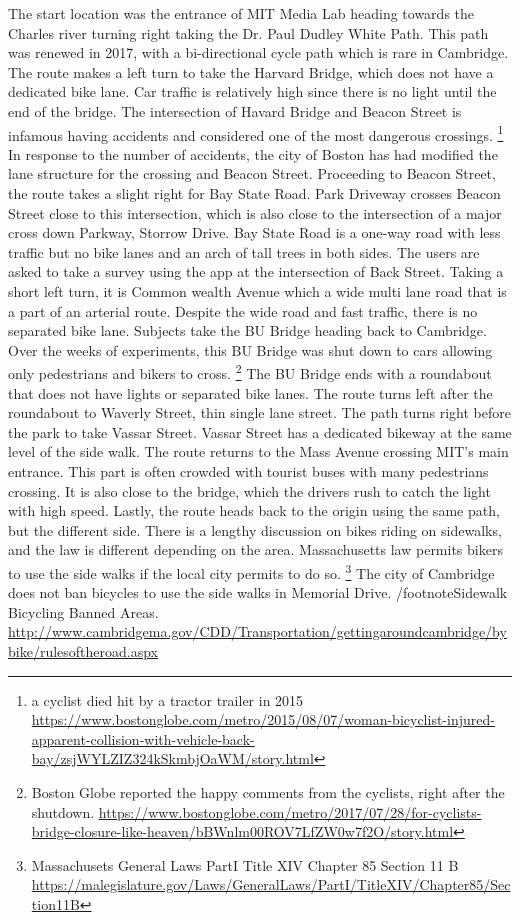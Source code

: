 The start location was the entrance of MIT Media Lab heading towards the
Charles river turning right taking the Dr. Paul Dudley White Path. This
path was renewed in 2017, with a bi-directional cycle path which is rare in
Cambridge. The route makes a left turn to take the Harvard Bridge, which
does not have a dedicated bike lane. Car traffic is relatively high since
there is no light until the end of the bridge. The intersection of Havard
Bridge and Beacon Street is infamous having accidents and considered one of
the most dangerous crossings. 
\footnote{a cyclist died hit by a tractor trailer in 2015
\url{https://www.bostonglobe.com/metro/2015/08/07/woman-bicyclist-injured-apparent-collision-with-vehicle-back-bay/zsjWYLZIZ324kSkmbjOaWM/story.html}}
In response to the number of accidents, the city of Boston has had modified
the lane structure for the crossing and Beacon Street. Proceeding to Beacon
Street, the route takes a slight right for Bay State Road. Park Driveway
crosses Beacon Street close to this intersection, which is also close to
the intersection of a major cross down Parkway, Storrow Drive. Bay State
Road is a one-way road with less traffic but no bike lanes and an arch of
tall trees in both sides. The users are asked to take a survey using the
app at the intersection of Back Street. Taking a short left turn, it is
Common wealth Avenue which a wide multi lane road that is a part of an
arterial route. Despite the wide road and fast traffic, there is no
separated bike lane. Subjects take the BU Bridge heading back to Cambridge.
Over the weeks of experiments, this BU Bridge was shut down to cars
allowing only pedestrians and bikers to cross.
\footnote{Boston Globe reported the happy comments from the cyclists, right
  after the shutdown. \url{https://www.bostonglobe.com/metro/2017/07/28/for-cyclists-bridge-closure-like-heaven/bBWnlm00ROV7LfZW0w7f2O/story.html}}
The BU Bridge ends with a roundabout that does not have lights or separated
bike lanes. The route turns left after the roundabout to Waverly Street,
thin single lane street. The path turns right before the park to take
Vassar Street. Vassar Street has a dedicated bikeway at the same level of
the side walk. The route returns to the Mass Avenue crossing MIT's main
entrance. This part is often crowded with tourist buses with many
pedestrians crossing. It is also close to the bridge, which the drivers
rush to catch the light with high speed. Lastly, the route heads back to
the origin using the same path, but the different side.
There is a lengthy discussion on bikes riding on sidewalks, and the law is
different depending on the area. Massachusetts law permits bikers to use
the side walks if the local city permits to do so. 
\footnote{Massachusets General Laws PartI Title XIV Chapter 85 Section 11 B
\url{https://malegislature.gov/Laws/GeneralLaws/PartI/TitleXIV/Chapter85/Section11B}}
The city of Cambridge does not ban bicycles to use the side walks in
Memorial Drive. /footnote{Sidewalk Bicycling Banned Areas.
\url{http://www.cambridgema.gov/CDD/Transportation/gettingaroundcambridge/bybike/rulesoftheroad.aspx}}

